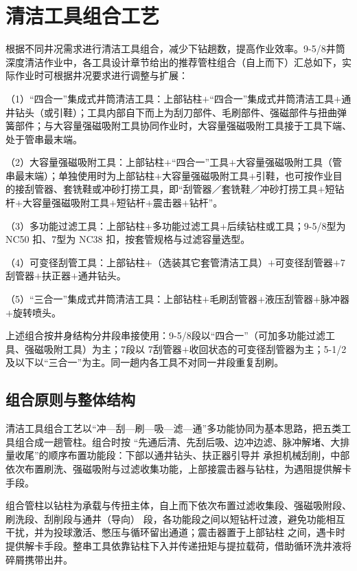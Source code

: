 \section{清洁工具组合工艺}

根据不同井况需求进行清洁工具组合，减少下钻趟数，提高作业效率。9-5/8\inch 井筒深度清洁作业中，各工具设计章节给出的推荐管柱组合（自上而下）汇总如下，实际作业时可根据井况要求进行调整与扩展：

（1）“四合一”集成式井筒清洁工具：上部钻柱$+$“四合一”集成式井筒清洁工具$+$通井钻头（或引鞋）；工具内部自下而上为刮刀部件、毛刷部件、强磁部件与扭曲弹簧部件；与大容量强磁吸附工具协同作业时，大容量强磁吸附工具接于工具下端、处于管串最末端。

（2）大容量强磁吸附工具：上部钻柱$+$“四合一”工具$+$大容量强磁吸附工具（管串最末端）；单独使用时为上部钻柱$+$大容量强磁吸附工具$+$引鞋，也可按作业目的接刮管器、套铣鞋或冲砂打捞工具，即“刮管器／套铣鞋／冲砂打捞工具$+$短钻杆$+$大容量强磁吸附工具$+$短钻杆$+$震击器$+$钻杆”。

（3）多功能过滤工具：上部钻柱$+$多功能过滤工具$+$后续钻柱或工具；9-5/8\inch 型为 NC50 扣、7\inch 型为 NC38 扣，按套管规格与过滤容量选型。

（4）可变径刮管工具：上部钻柱$+$（选装其它套管清洁工具）$+$可变径刮管器$+$7\inch 刮管器$+$扶正器$+$通井钻头。

（5）“三合一”集成式井筒清洁工具：上部钻柱$+$毛刷刮管器$+$液压刮管器$+$脉冲器$+$旋转喷头。

上述组合按井身结构分井段串接使用：9-5/8\inch 段以“四合一”（可加多功能过滤工具、强磁吸附工具）为主；7\inch 段以 7\inch 刮管器$+$收回状态的可变径刮管器为主；5-1/2\inch 及以下以“三合一”为主。同一趟内各工具不对同一井段重复刮刷。

\subsection{组合原则与整体结构}

清洁工具组合工艺以“冲—刮—刷—吸—滤—通”多功能协同为基本思路，把五类工具组合成一趟管柱。组合时按
“先通后清、先刮后吸、边冲边滤、脉冲解堵、大排量收尾”的顺序布置功能段：下部以通井钻头、扶正器引导并
承担机械刮削，中部依次布置刷洗、强磁吸附与过滤收集功能，上部接震击器与钻柱，为遇阻提供解卡手段。

组合管柱以钻柱为承载与传扭主体，自上而下依次布置过滤收集段、强磁吸附段、刷洗段、刮削段与通井（导向）
段，各功能段之间以短钻杆过渡，避免功能相互干扰，并为投球激活、憋压与循环留出通道；震击器置于上部钻柱
之间，遇卡时提供解卡手段。整串工具依靠钻柱下入并传递扭矩与提拉载荷，借助循环洗井液将碎屑携带出井。

